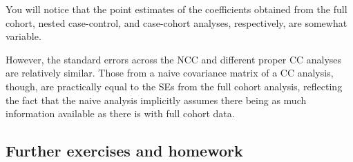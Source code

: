 \begin{enumerate}[resume]
\begin{Schunk}
\end{Schunk}

You will notice that the point estimates of the coefficients
obtained from the full cohort, nested case-control, and case-cohort analyses, 
respectively, are somewhat variable. 

However,  
the standard errors across the NCC and different proper CC
 analyses are relatively similar. Those from a naive covariance matrix of a CC analysis,
though, are practically equal to the SEs from the full cohort analysis,
reflecting the fact that the naive analysis implicitly assumes
there being as much information available as there is with full cohort data.
\end{enumerate}

\subsection{Further exercises and homework}

